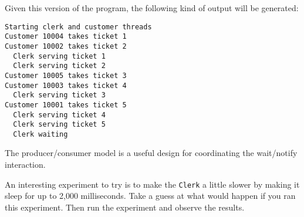 \noindent Given this version of the program, the following kind of
output will be generated:


\begin{jjjlisting}
\begin{lstlisting}
Starting clerk and customer threads
Customer 10004 takes ticket 1
Customer 10002 takes ticket 2
  Clerk serving ticket 1
  Clerk serving ticket 2
Customer 10005 takes ticket 3
Customer 10003 takes ticket 4
  Clerk serving ticket 3
Customer 10001 takes ticket 5
  Clerk serving ticket 4
  Clerk serving ticket 5
  Clerk waiting
\end{lstlisting}
\end{jjjlisting}




{The producer/consumer model is a useful design for coordinating the wait/notify interaction.}

\begin{SSTUDY}

\item  An interesting experiment to try is to make the {\tt Clerk} a little
slower by making it sleep for up to 2,000 milliseconds.  Take a
guess at what would happen if you ran this experiment.  Then
run the experiment and observe the results.
\end{SSTUDY}

